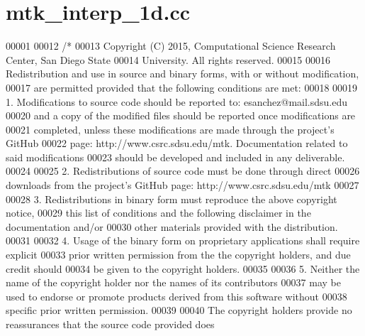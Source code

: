 \hypertarget{mtk__interp__1d_8cc_source}{\section{mtk\+\_\+interp\+\_\+1d.\+cc}
\label{mtk__interp__1d_8cc_source}
}

\begin{DoxyCode}
00001 
00012 \textcolor{comment}{/*}
00013 \textcolor{comment}{Copyright (C) 2015, Computational Science Research Center, San Diego State}
00014 \textcolor{comment}{University. All rights reserved.}
00015 \textcolor{comment}{}
00016 \textcolor{comment}{Redistribution and use in source and binary forms, with or without modification,}
00017 \textcolor{comment}{are permitted provided that the following conditions are met:}
00018 \textcolor{comment}{}
00019 \textcolor{comment}{1. Modifications to source code should be reported to: esanchez@mail.sdsu.edu}
00020 \textcolor{comment}{and a copy of the modified files should be reported once modifications are}
00021 \textcolor{comment}{completed, unless these modifications are made through the project's GitHub}
00022 \textcolor{comment}{page: http://www.csrc.sdsu.edu/mtk. Documentation related to said modifications}
00023 \textcolor{comment}{should be developed and included in any deliverable.}
00024 \textcolor{comment}{}
00025 \textcolor{comment}{2. Redistributions of source code must be done through direct}
00026 \textcolor{comment}{downloads from the project's GitHub page: http://www.csrc.sdsu.edu/mtk}
00027 \textcolor{comment}{}
00028 \textcolor{comment}{3. Redistributions in binary form must reproduce the above copyright notice,}
00029 \textcolor{comment}{this list of conditions and the following disclaimer in the documentation and/or}
00030 \textcolor{comment}{other materials provided with the distribution.}
00031 \textcolor{comment}{}
00032 \textcolor{comment}{4. Usage of the binary form on proprietary applications shall require explicit}
00033 \textcolor{comment}{prior written permission from the the copyright holders, and due credit should}
00034 \textcolor{comment}{be given to the copyright holders.}
00035 \textcolor{comment}{}
00036 \textcolor{comment}{5. Neither the name of the copyright holder nor the names of its contributors}
00037 \textcolor{comment}{may be used to endorse or promote products derived from this software without}
00038 \textcolor{comment}{specific prior written permission.}
00039 \textcolor{comment}{}
00040 \textcolor{comment}{The copyright holders provide no reassurances that the source code provided does}

\end{DoxyCode}
